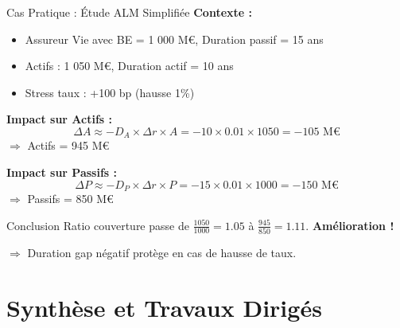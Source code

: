 \documentclass[10pt,aspectratio=169]{beamer}
\begin{document}
\begin{frame}{Cas Pratique : Étude ALM Simplifiée}
\textbf{Contexte :}
\begin{itemize}
    \item Assureur Vie avec BE = 1 000 M€, Duration passif = 15 ans
    \item Actifs : 1 050 M€, Duration actif = 10 ans
    \item Stress taux : +100 bp (hausse 1\%)
\end{itemize}

\vspace{0.3cm}
\textbf{Impact sur Actifs :}
\[
\Delta A \approx -D_A \times \Delta r \times A = -10 \times 0.01 \times 1050 = -105 \text{ M€}
\]
$\Rightarrow$ Actifs = 945 M€

\vspace{0.3cm}
\textbf{Impact sur Passifs :}
\[
\Delta P \approx -D_P \times \Delta r \times P = -15 \times 0.01 \times 1000 = -150 \text{ M€}
\]
$\Rightarrow$ Passifs = 850 M€

\vspace{0.3cm}
\begin{alertblock}{Conclusion}
Ratio couverture passe de $\frac{1050}{1000} = 1.05$ à $\frac{945}{850} = 1.11$. \textbf{Amélioration !}

$\Rightarrow$ Duration gap négatif protège en cas de hausse de taux.
\end{alertblock}
\end{frame}

\section{Synthèse et Travaux Dirigés}
\end{document}
